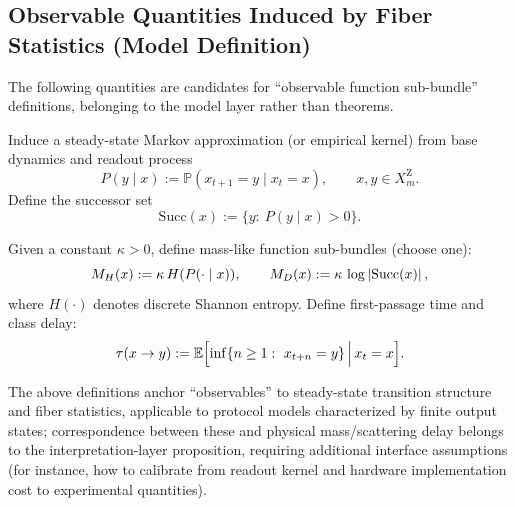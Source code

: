 \subsection{Observable Quantities Induced by Fiber Statistics (Model Definition)}\label{sec:induced-observables}

The following quantities are candidates for ``observable function sub-bundle'' definitions, belonging to the model layer rather than theorems.

\begin{definition}\label{def:markov-kernel}
Induce a steady-state Markov approximation (or empirical kernel) from base dynamics and readout process
\[
P(y\mid x):=\mathbb{P}(x_{t+1}=y\mid x_t=x),
\qquad x,y\in X_m^{\mathrm Z}.
\]
Define the successor set
\[
\mathrm{Succ}(x):=\{y:\ P(y\mid x)>0\}.
\]
\end{definition}

\begin{definition}\label{def:class-mass-delay}
Given a constant $\kappa>0$, define mass-like function sub-bundles (choose one):
\[
M_H(x):=\kappa\, H(P(\cdot\mid x)),\qquad
M_D(x):=\kappa\,\log\left\lvert \mathrm{Succ}(x)\right\rvert,
\]
where $H(\cdot)$ denotes discrete Shannon entropy. Define first-passage time and class delay:
\[
\tau(x\to y):=\mathbb{E}\Bigl[\inf\{n\ge 1:\ x_{t+n}=y\}\,\Big|\,x_t=x\Bigr].
\]
\end{definition}

\begin{remark}
The above definitions anchor ``observables'' to steady-state transition structure and fiber statistics, applicable to protocol models characterized by finite output states; correspondence between these and physical mass/scattering delay belongs to the interpretation-layer proposition, requiring additional interface assumptions (for instance, how to calibrate from readout kernel and hardware implementation cost to experimental quantities).
\end{remark}
